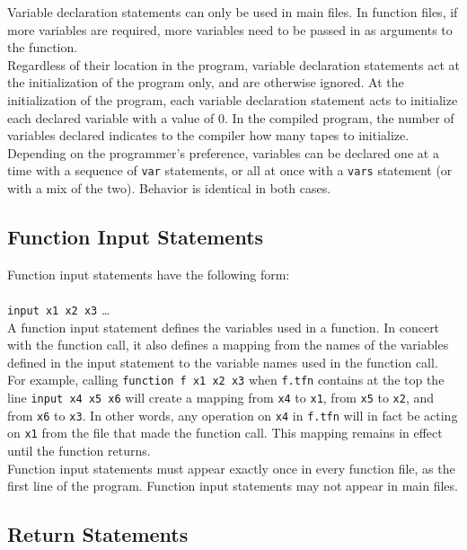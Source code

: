 \documentclass[11pt]{report}
\begin{document}
Variable declaration statements can only be used in main files. In function files, if more variables are required, more variables need to be passed in as arguments to the function. \\

Regardless of their location in the program, variable declaration statements act at the initialization of the program only, and are otherwise ignored. At the initialization of the program, each variable declaration statement acts to initialize each declared variable with a value of 0. In the compiled program, the number of variables declared indicates to the compiler how many tapes to initialize. \\

Depending on the programmer's preference, variables can be declared one at a time with a sequence of \texttt{var} statements, or all at once with a \texttt{vars} statement (or with a mix of the two). Behavior is identical in both cases.

\subsection{Function Input Statements}

Function input statements have the following form: \\ \\
\texttt{input x1 x2 x3} \dots \\

A function input statement defines the variables used in a function. In concert with the function call, it also defines a mapping from the names of the variables defined in the input statement to the variable names used in the function call. For example, calling \texttt{function f x1 x2 x3} when \texttt{f.tfn} contains at the top the line \texttt{input x4 x5 x6} will create a mapping from \texttt{x4} to \texttt{x1}, from \texttt{x5} to \texttt{x2}, and from \texttt{x6} to \texttt{x3}. In other words, any operation on \texttt{x4} in \texttt{f.tfn} will in fact be acting on \texttt{x1} from the file that made the function call. This mapping remains in effect until the function returns. \\

Function input statements must appear exactly once in every function file, as the first line of the program. Function input statements may not appear in main files.

\subsection{Return Statements}
\end{document}

